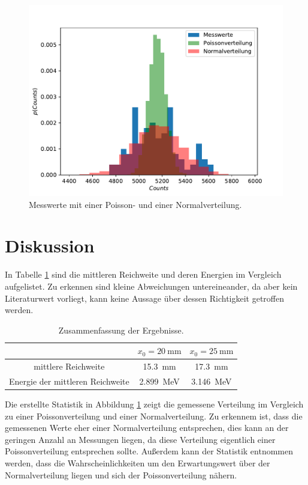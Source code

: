 \begin{figure}
  \centering
  \includegraphics[scale=0.8]{Statistik.pdf}
  \caption{Messwerte mit einer Poisson- und einer Normalverteilung.}
  \label{abb:4}
\end{figure}

\section{Diskussion}
In Tabelle \ref{tab:4} sind die mittleren Reichweite und deren Energien im Vergleich aufgelistet. Zu erkennen sind kleine Abweichungen untereineander,
da aber kein Literaturwert vorliegt, kann keine Aussage über dessen Richtigkeit getroffen werden.
\begin{table}
  \centering
  \caption{Zusammenfassung der Ergebnisse.}
  \label{tab:4}
  \begin{tabular}{c c c}
    \toprule
    & $x_0=\SI{20}{\milli\meter}$ &  $x_0=\SI{25}{\milli\meter}$ \\
    \midrule
    mittlere Reichweite & \SI{15,3}{\milli\meter} & \SI{17,3}{\milli\meter} \\
    Energie der mittleren Reichweite & \SI{2,899}{\mega\eV} & \SI{3,146}{\mega\eV} \\
    \bottomrule
  \end{tabular}
\end{table}

Die erstellte Statistik in Abbildung \ref{abb:4} zeigt die gemessene Verteilung im Vergleich zu einer Poissonverteilung und einer Normalverteilung.
Zu erkennem ist, dass die gemessenen Werte eher einer Normalverteilung entsprechen, dies kann an der geringen Anzahl an Messungen liegen, da diese
Verteilung eigentlich einer Poissonverteilung entsprechen sollte. Außerdem kann der Statistik entnommen werden, dass die Wahrscheinlichkeiten um
den Erwartungswert über der Normalverteilung liegen und sich der Poissonverteilung nähern.

\nocite{*}
\printbibliography
